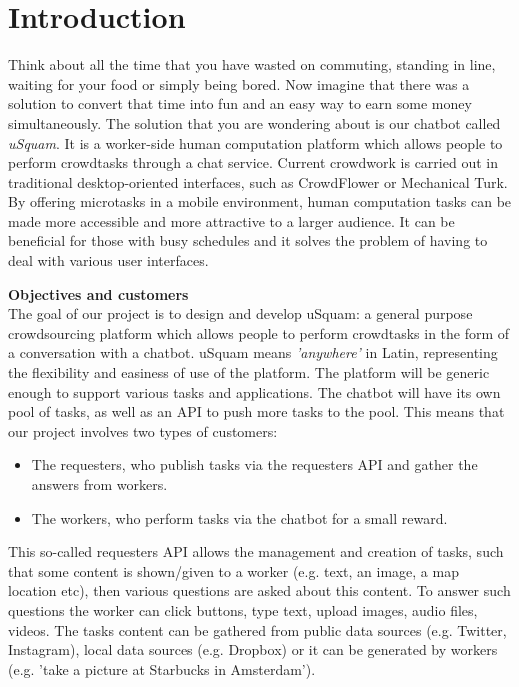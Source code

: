 \documentclass[a4paper,dutch,fleqn]{exam}
\begin{document}
\section{Introduction}
Think about all the time that you have wasted on commuting, standing in line, waiting for your food or simply being bored. Now imagine that there was a solution to convert that time into fun and an easy way to earn some money simultaneously. The solution that you are wondering about is our chatbot called \emph{uSquam}. It is a worker-side human computation platform which allows people to perform crowdtasks through a chat service. Current crowdwork is carried out in traditional desktop-oriented interfaces, such as CrowdFlower or Mechanical Turk. By offering microtasks in a mobile environment, human computation tasks can be made more accessible and more attractive to a larger audience. It can be beneficial for those with busy schedules and it solves the problem of having to deal with various user interfaces.

\textbf{Objectives and customers} \\
The goal of our project is to design and develop uSquam: a general purpose crowdsourcing platform which allows people to perform crowdtasks in the form of a conversation with a chatbot. uSquam means \emph{'anywhere'} in Latin, representing the flexibility and easiness of use of the platform. The platform will be generic enough to support various tasks and applications. The chatbot will have its own pool of tasks, as well as an API to push more tasks to the pool. This means that our project involves two types of customers:

\begin{itemize}
\itemsep0em 
\item The requesters, who publish tasks via the requesters API and gather the answers from workers.
\item The workers, who perform tasks via the chatbot for a small reward.
\end{itemize}

This so-called requesters API allows the management and creation of tasks, such that some content is shown/given to a worker (e.g. text, an image, a map location etc), then various questions are asked about this content. To answer such questions the worker can click buttons, type text, upload images, audio files, videos. The tasks content can be gathered from public data sources (e.g. Twitter, Instagram), local data sources (e.g. Dropbox) or it can be generated by workers (e.g. 'take a picture at Starbucks in Amsterdam').
\end{document}
